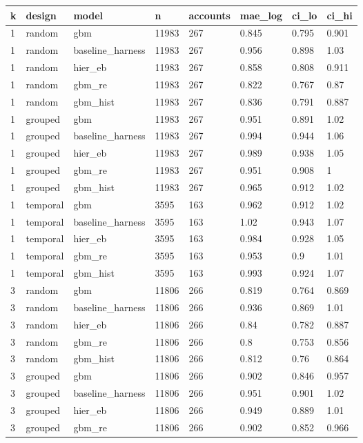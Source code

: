 \begin{tabular}{llllllll}
\toprule
k & design & model & n & accounts & mae\_log & ci\_lo & ci\_hi \\
\midrule
1 & random & gbm & 11983 & 267 & 0.845 & 0.795 & 0.901 \\
1 & random & baseline\_harness & 11983 & 267 & 0.956 & 0.898 & 1.03 \\
1 & random & hier\_eb & 11983 & 267 & 0.858 & 0.808 & 0.911 \\
1 & random & gbm\_re & 11983 & 267 & 0.822 & 0.767 & 0.87 \\
1 & random & gbm\_hist & 11983 & 267 & 0.836 & 0.791 & 0.887 \\
1 & grouped & gbm & 11983 & 267 & 0.951 & 0.891 & 1.02 \\
1 & grouped & baseline\_harness & 11983 & 267 & 0.994 & 0.944 & 1.06 \\
1 & grouped & hier\_eb & 11983 & 267 & 0.989 & 0.938 & 1.05 \\
1 & grouped & gbm\_re & 11983 & 267 & 0.951 & 0.908 & 1 \\
1 & grouped & gbm\_hist & 11983 & 267 & 0.965 & 0.912 & 1.02 \\
1 & temporal & gbm & 3595 & 163 & 0.962 & 0.912 & 1.02 \\
1 & temporal & baseline\_harness & 3595 & 163 & 1.02 & 0.943 & 1.07 \\
1 & temporal & hier\_eb & 3595 & 163 & 0.984 & 0.928 & 1.05 \\
1 & temporal & gbm\_re & 3595 & 163 & 0.953 & 0.9 & 1.01 \\
1 & temporal & gbm\_hist & 3595 & 163 & 0.993 & 0.924 & 1.07 \\
3 & random & gbm & 11806 & 266 & 0.819 & 0.764 & 0.869 \\
3 & random & baseline\_harness & 11806 & 266 & 0.936 & 0.869 & 1.01 \\
3 & random & hier\_eb & 11806 & 266 & 0.84 & 0.782 & 0.887 \\
3 & random & gbm\_re & 11806 & 266 & 0.8 & 0.753 & 0.856 \\
3 & random & gbm\_hist & 11806 & 266 & 0.812 & 0.76 & 0.864 \\
3 & grouped & gbm & 11806 & 266 & 0.902 & 0.846 & 0.957 \\
3 & grouped & baseline\_harness & 11806 & 266 & 0.951 & 0.901 & 1.02 \\
3 & grouped & hier\_eb & 11806 & 266 & 0.949 & 0.889 & 1.01 \\
3 & grouped & gbm\_re & 11806 & 266 & 0.902 & 0.852 & 0.966 \\

\end{tabular}

